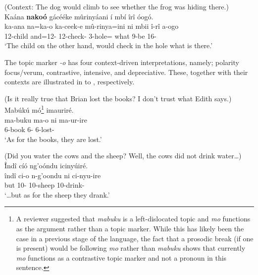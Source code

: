 \documentclass[output=paper]{langscibook}
\begin{document}
\z

\ea
\label{bkm:Ref115795536}\label{bkm:Ref119738623}
(Context: The dog would climb to see whether the frog was hiding there.)\\
Kaána \textbf{nakoó} gácééke mûrinyáani í mbí îrî óogó.\\
\gll
ka-ana  na=ka-o  ka-ceek-e  mû-rinya=ini  ni  mbii  î-rî  a-ogo\\
12-child  and=12-\PRO{} 12\SM{}-check-\SBJV{} 3-hole=\LOC{} \FOC{} what  9-be  16-\DEM{}\\
\glt
‘The child on the other hand, would check in the hole what is there.’

\z


The topic marker \textit{-o} has four context-driven interpretations, namely; polarity focus/verum, contrastive, intensive, and depreciative. These, together with their contexts are illustrated in  to , respectively.

\ea
\label{bkm:Ref115795558}
(Is it really true that Brian lost the books? I don’t trust what Edith says.)\\
Mabúkú mó\footnote{A reviewer suggested that \textit{mabuku} is a left-dislocated topic and \textit{mo} functions as the argument rather than a topic marker. While this has likely been the case in a previous stage of the language, the fact that a prosodic break (if one is present) would be following \textit{mo} rather than \textit{mabuku} shows that currently \textit{mo} functions as a contrastive topic marker and not a pronoun in this sentence.} imauriré.\\
\gll
ma-buku  ma-o ni  ma-ur-ire\\
6-book 6-\PRO{}  \FOC{}  6\SM{}-lost-\PFV{}\\
\glt
‘As for the books, they are lost.’   

\z

\ea
\label{bkm:Ref115795560}
(Did you water the cows and the sheep? Well, the cows did not drink water…)\\
\'{Î}ndî cíó ng'oóndu icinyúiré. \\
\gll
îndî  ci-o  n-g’oondu  ni  ci-nyu-ire\\
but  10-\PRO{} 10-sheep \FOC{} 10\SM{}-drink-\PFV{}\\
\glt
‘…but as for the sheep they drank.’ \jambox*{[contrastive]}
\end{document}
